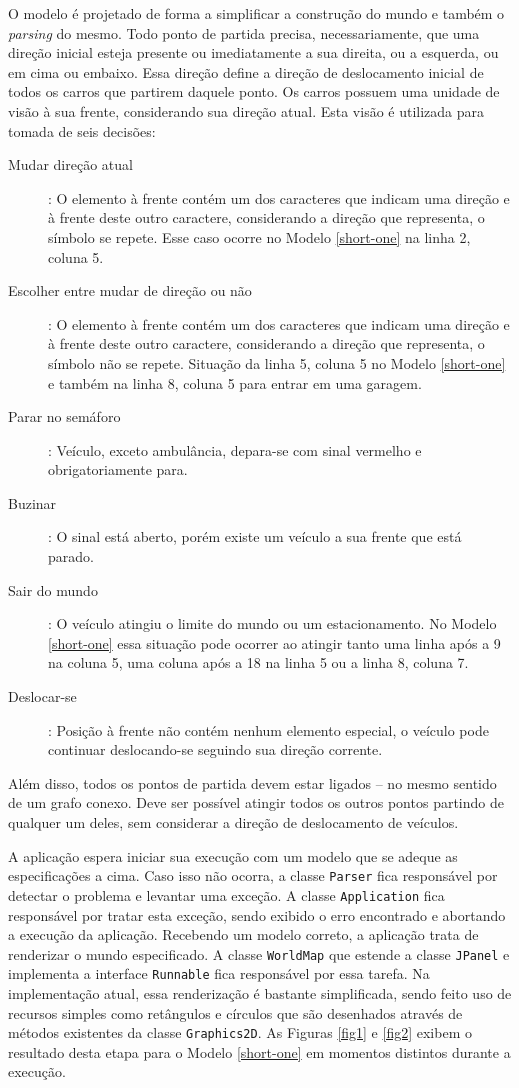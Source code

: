 O modelo é projetado de forma a simplificar a construção do mundo e
também o \textit{parsing} do mesmo. Todo ponto de partida precisa,
necessariamente, que uma direção inicial esteja presente ou
imediatamente a sua direita, ou a esquerda, ou em cima ou
embaixo. Essa direção define a direção de deslocamento inicial de
todos os carros que partirem daquele ponto. Os carros possuem uma
unidade de visão à sua frente, considerando sua direção atual. Esta
visão é utilizada para tomada de seis decisões:
\begin{description}
\item[Mudar direção atual]: O elemento à frente contém um dos
  caracteres que indicam uma direção e à frente deste outro caractere,
  considerando a direção que representa, o símbolo se repete. Esse
  caso ocorre no Modelo \ref{short-one} na linha 2, coluna 5.
\item[Escolher entre mudar de direção ou não]: O elemento à frente
  contém um dos caracteres que indicam uma direção e à frente deste
  outro caractere, considerando a direção que representa, o símbolo
  não se repete. Situação da linha 5, coluna 5 no Modelo
  \ref{short-one} e também na linha 8, coluna 5 para entrar em uma garagem.
\item[Parar no semáforo]: Veículo, exceto ambulância, depara-se com
  sinal vermelho e obrigatoriamente para.
\item[Buzinar]: O sinal está aberto, porém existe um veículo a sua
  frente que está parado.
\item[Sair do mundo]: O veículo atingiu o limite do mundo ou um
  estacionamento. No Modelo
  \ref{short-one} essa situação pode ocorrer ao atingir tanto uma
  linha após a 9 na coluna 5, uma coluna após a 18 na linha 5 ou
  a linha 8, coluna 7.
\item[Deslocar-se]: Posição à frente não contém nenhum elemento
  especial, o veículo pode continuar deslocando-se seguindo sua
  direção corrente.
\end{description}
Além disso, todos os pontos de partida devem estar ligados -- no mesmo
sentido de um grafo conexo. Deve ser possível atingir todos os outros
pontos partindo de qualquer um deles, sem considerar a direção de
deslocamento de veículos.

A aplicação espera iniciar sua execução com um modelo que se adeque as
especificações a cima. Caso isso não ocorra, a classe \verb!Parser!
fica responsável por detectar o problema e levantar uma exceção. A
classe \verb!Application! fica responsável por tratar esta exceção,
sendo exibido o erro encontrado e abortando a execução da aplicação.
Recebendo um modelo correto, a aplicação trata de renderizar o mundo
especificado. A classe \verb!WorldMap! que estende a classe
\verb!JPanel! e implementa a interface \verb!Runnable! fica
responsável por essa tarefa. Na implementação atual, essa renderização
é bastante simplificada, sendo feito uso de recursos simples como
retângulos e círculos que são desenhados através de métodos existentes
da classe \verb!Graphics2D!. As Figuras \ref{fig1} e \ref{fig2} exibem
o resultado desta etapa para o Modelo \ref{short-one} em momentos
distintos durante a execução.

